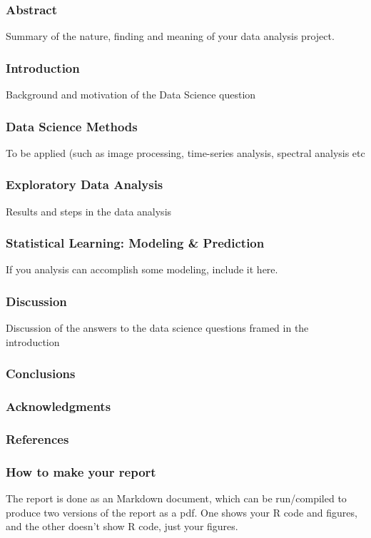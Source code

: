 \documentclass[11pt]{article} %
\begin{document}
  
  \subsubsection{Abstract} 
    Summary of the nature, finding and meaning of your data analysis project. 
  
  \subsubsection{Introduction}
    Background and motivation of the Data Science question
  
  \subsubsection{Data Science Methods}
    To be applied (such as image processing, time-series analysis, spectral analysis etc
  
  \subsubsection{Exploratory Data Analysis}
    Results and steps in the data analysis
  
  \subsubsection{Statistical Learning: Modeling \& Prediction}
    If you analysis can accomplish some modeling, include it here.
  
  \subsubsection{Discussion}
    Discussion of the answers to the data science questions framed in the introduction
  
  \subsubsection{Conclusions}
  
  \subsubsection{Acknowledgments} 
  
  \subsubsection{References}
  
  \subsubsection{How to make your report}  
    The report is done as an Markdown document, which can be run/compiled to produce two versions of the report as a pdf. 
    One shows your R code and figures, and the other doesn't show R code, just your figures. 
    
\end{document}
